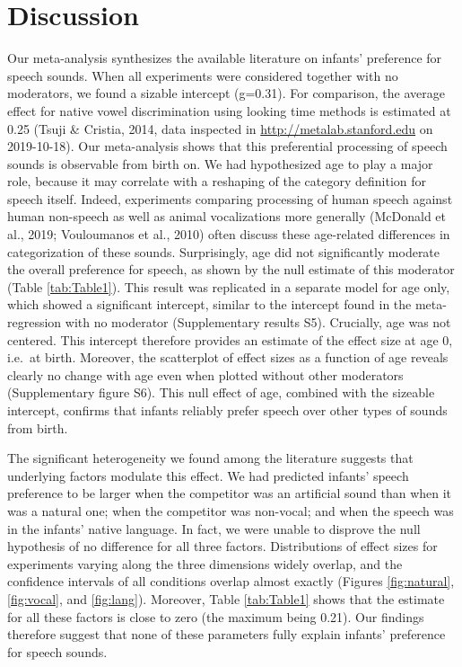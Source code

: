 \documentclass[man]{apa6}
\begin{document}
\hypertarget{discussion}{%
\section{Discussion}\label{discussion}}

Our meta-analysis synthesizes the available literature on infants' preference for speech sounds. When all experiments were considered together with no moderators, we found a sizable intercept (g=0.31). For comparison, the average effect for native vowel discrimination using looking time methods is estimated at 0.25 (Tsuji \& Cristia, 2014, data inspected in \url{http://metalab.stanford.edu} on 2019-10-18). Our meta-analysis shows that this preferential processing of speech sounds is observable from birth on. We had hypothesized age to play a major role, because it may correlate with a reshaping of the category definition for speech itself. Indeed, experiments comparing processing of human speech against human non-speech as well as animal vocalizations more generally (McDonald et al., 2019; Vouloumanos et al., 2010) often discuss these age-related differences in categorization of these sounds. Surprisingly, age did not significantly moderate the overall preference for speech, as shown by the null estimate of this moderator (Table \ref{tab:Table1}). This result was replicated in a separate model for age only, which showed a significant intercept, similar to the intercept found in the meta-regression with no moderator (Supplementary results S5). Crucially, age was not centered. This intercept therefore provides an estimate of the effect size at age 0, i.e.~at birth. Moreover, the scatterplot of effect sizes as a function of age reveals clearly no change with age even when plotted without other moderators (Supplementary figure S6). This null effect of age, combined with the sizeable intercept, confirms that infants reliably prefer speech over other types of sounds from birth.

The significant heterogeneity we found among the literature suggests that underlying factors modulate this effect. We had predicted infants' speech preference to be larger when the competitor was an artificial sound than when it was a natural one; when the competitor was non-vocal; and when the speech was in the infants' native language. In fact, we were unable to disprove the null hypothesis of no difference for all three factors. Distributions of effect sizes for experiments varying along the three dimensions widely overlap, and the confidence intervals of all conditions overlap almost exactly (Figures \ref{fig:natural}, \ref{fig:vocal}, and \ref{fig:lang}). Moreover, Table \ref{tab:Table1} shows that the estimate for all these factors is close to zero (the maximum being 0.21). Our findings therefore suggest that none of these parameters fully explain infants' preference for speech sounds.
\end{document}
